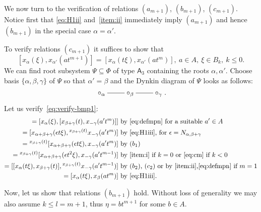 \documentclass[oneside, 10pt]{amsart}
\numberwithin{equation}{section}
\numberwithin{lemma}{section}
\theoremstyle{definition}
\theoremstyle{remark}
\begin{document}
We now turn to the verification of relations $(a_{m+1})$, $(b_{m+1})$, $(c_{m+1})$.
Notice first that \eqref{eq:H1ii} and~\eqref{item:ii} immediately imply $(a_{m+1})$ and hence $(b_{m+1})$ in the special case $\alpha=\alpha'$.

To verify relations $(c_{m+1})$ it suffices to show that
\begin{equation}
\label{eq:verify-bmp1} [x_\alpha(\xi), x_{\alpha'}(at^{m+1})] = [x_\alpha(t\xi), x_{\alpha'}(at^m)],\ a \in A,\ \xi \in B_k,\ k\leq 0.
\end{equation}
We can find root subsystem $\Psi \subseteq \Phi$ of type $\mathsf{A}_3$ containing the roots $\alpha, \alpha'$.
Choose basis $\{\alpha,\beta,\gamma\}$ of $\Psi$ so that $\alpha'=\beta$ and the Dynkin diagram of $\Psi$ looks as follows:
\begin{equation}\label{eq:diagA3} \xymatrix{\circ_\alpha \ar@{-}[r] & \circ_\beta \ar@{-}[r] & \circ_\gamma}.\end{equation}
Let us verify~\eqref{eq:verify-bmp1}:
\begin{align*}
   [x_\alpha(\xi), x_\beta(at^{m+1})] = [x_\alpha(\xi), [x_{\beta + \gamma}(t), x_{-\gamma}(a't^m)]]&  \text{ by~\eqref{eq:defmpn} for a suitable $a'\in A$} \\ 
 = [x_{\alpha+\beta+\gamma}(\epsilon t\xi), {}^{x_{\beta+\gamma}(t)}x_{-\gamma}(a't^m)]             &  \text{ by~\eqref{eq:H1iii}, for $\epsilon=N_{\alpha, \beta+\gamma}$} \\
 = {}^{x_{\beta+\gamma}(t)}[x_{\alpha+\beta+\gamma}(\epsilon t\xi), x_{-\gamma}(a't^m)]             &  \text{ by $(b_1)$} \\
 = {}^{x_{\beta+\gamma}(t)}[x_{\alpha+\beta+\gamma}(\epsilon t^2\xi), x_{-\gamma}(a't^{m-1})]       &  \text{ by~\eqref{item:i} if $k=0$ or~\eqref{eq:cm} if $k <0$} \\
 = [[x_\alpha(t\xi), x_{\beta+\gamma}(t)], {}^{x_{\beta+\gamma}(t)} x_{-\gamma}(a't^{m-1})]         &  \text{ by~$(b_2)$, $(c_2)$ or by~\eqref{item:ii},\eqref{eq:defmpn} if $m=1$} \\
 = [x_\alpha(t\xi), x_\beta(at^m)]                                                                  &  \text{ by~\eqref{eq:H1iii}.}
\end{align*}

Now, let us show that relations $(b_{m+1})$ hold. 
Without loss of generality we may also assume $k \leq l=m+1$, thus $\eta = bt^{m+1}$ for some $b\in A$.
\end{document}
